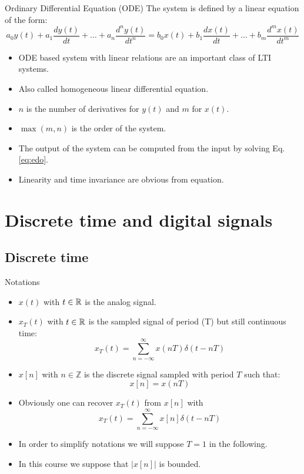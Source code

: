 \begin{block}{Ordinary Differential Equation (ODE)}
  The system is defined by a linear equation of the form:
  \begin{equation}
    \label{eq:edo}
    a_0y(t)+a_1\frac{dy(t)}{dt}+\dots+a_n\frac{d^ny(t)}{dt^n}=
    b_0x(t)+b_1\frac{dx(t)}{dt} +\dots+b_m\frac{d^mx(t)}{dt^m}
  \end{equation}
  
  \begin{itemize}
  \item ODE based system with linear relations are an important class of LTI systems.
  \item Also called homogeneous linear differential equation.
  \item $n$ is the number of derivatives for $y(t)$ and $m$ for $x(t)$.
  \item $\max(m,n)$ is the order of the system.
  \item The output of the system can be computed from the input by solving Eq.
    \eqref{eq:edo}.
    \item Linearity and time invariance are obvious from equation.
  \end{itemize}
  
  \end{block}


\section{Discrete time and digital signals}
\label{sec:def_discrete_signal}

\subsection{Discrete time}

  
\begin{block}{Notations}
  \begin{itemize}
      \item $x(t)$ with $t\in\mathbb{R}$ is the analog signal.
      \item $x_T(t)$ with $t\in\mathbb{R}$ is the sampled signal of period (T) but still continuous time:
      $$  x_T(t)=\sum_{n=-\infty}^\infty x(nT)\delta(t-nT) $$
      \item $x[n]$ with $n\in\mathbb{Z}$ is the discrete signal sampled with period $T$ such that:
      $$  x[n]= x(nT) $$
      \item Obviously one can recover $x_T(t)$ from $x[n]$ with
      $$  x_T(t)=\sum_{n=-\infty}^\infty x[n]\delta(t-nT) $$
      \item In order to simplify notations we will suppose $T=1$ in the following.
      \item In this course we suppose that $|x[n]|$ is bounded.
  \end{itemize}
\end{block}


